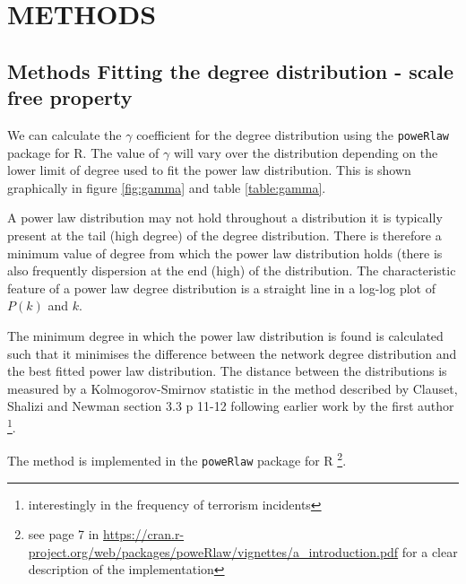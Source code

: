 
\section{METHODS}

\subsection{Methods Fitting the degree distribution - scale free property}

We can calculate the $\gamma$ coefficient for the degree distribution using the \texttt{poweRlaw} package for R. The value of $\gamma$ will vary over the distribution depending on the lower limit of degree used to fit the power law distribution. This is shown graphically in figure \ref{fig:gamma} and table \ref{table:gamma}.

A power law distribution may not hold throughout a distribution it is typically present at the tail (high degree) of the degree distribution. There is therefore a minimum value of degree from which the power law distribution holds (there is also frequently dispersion at the end (high) of the distribution. The characteristic feature of a power law degree distribution is a straight line in a log-log plot of $ P(k)$ and $k$.

The minimum degree in which the power law distribution is found is calculated such that it minimises the difference between the network degree distribution and the best fitted power law distribution. The distance between the distributions is measured by a Kolmogorov-Smirnov statistic in the method described by Clauset, Shalizi and Newman \cite{clauset2009power} section 3.3 p 11-12  following earlier work by the first author \cite{clauset2007frequency} \footnote{interestingly in the frequency of terrorism incidents}. 

The method is implemented in the \texttt{poweRlaw} package for R \cite{gillespie2015fitting}\footnote{see page 7 in \url{https://cran.r-project.org/web/packages/poweRlaw/vignettes/a_introduction.pdf} for a clear description of the implementation}.

